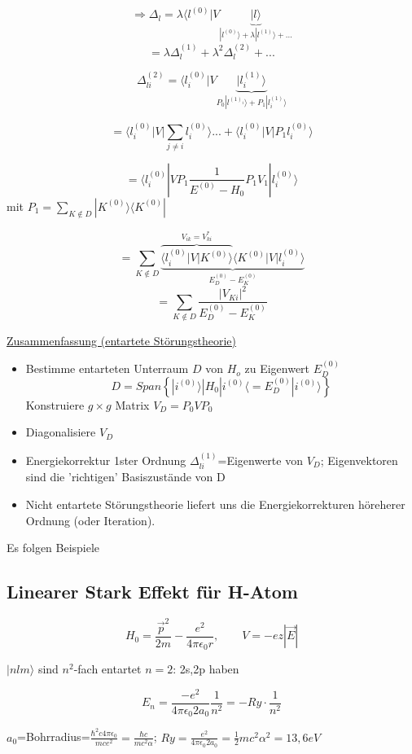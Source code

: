 \[ \Rightarrow \Delta_l = \lambda \langle l^{(0)}| V \underbrace{|l\rangle}_{|l^{(0)}\rangle+\lambda|l^{(1)}\rangle+...}\]
\[ =\lambda \Delta^{(1)}_l+\lambda^2\Delta^{(2)}_l+...\]


\[  \Delta^{(2)}_{li} = \langle l^{(0)}_i| V \underbrace{|l^{(1)}_i\rangle}_{P_0|l^{(1)_i}\rangle+P_1|l^{(1)}_i\rangle}\]

\[ = \langle l^{(0)}_i| V |\sum_{j\neq i}l^{(0)}_i\rangle ...+\langle l^{(0)}_i|  V |P_1 l^{(0)}_i\rangle\]

\[ = \langle l^{(0)}_i| V P_1 \frac{1}{E^{(0)}-H_0} P_1V_1|l^{(0)}_i\rangle\]
mit \(P_1 = \sum_{K\notin D}|K^{(0)}\rangle\langle K^{(0)}|\)

\[ =  \sum_{K\notin D}\underbrace{\overbrace{\langle l^{(0)}_i| V | K^{(0)}\rangle}^{V_{ik}=V^*_{ki}}\langle K^{(0)}| V | l^{(0)}_i\rangle}_{E^{(0)}_D-E^{(0)}_K}\]
\[ =  \sum_{K\notin D} \frac{|V_{Ki}|^2}{E^{(0)}_D-E^{(0)}_K}\]


\underline{Zusammenfassung (entartete Störungstheorie)}


\begin{itemize}
\item Bestimme entarteten Unterraum \(D\) von \(H_o\) zu Eigenwert \(E^{(0)}_D\)
\[ D = Span\left\{ |i^{(0)}\rangle | H_0|i^{(0)}\langle = E^{(0)}_D |i^{(0)}\rangle \right\}\]
Konstruiere \(g\times g\) Matrix \(V_D = P_0VP_0\)
\item Diagonalisiere \(V_D\)
\item Energiekorrektur 1ster Ordnung \(\Delta^{(1)}_{li}\)=Eigenwerte von \(V_D\); Eigenvektoren sind die 'richtigen' Basiszustände von D
\item Nicht entartete Störungstheorie liefert uns die Energiekorrekturen höreherer Ordnung (oder Iteration).
\end{itemize}

Es folgen Beispiele

\subsection{Linearer Stark Effekt für H-Atom}


\[ H_0 = \frac{\vec p^2}{2m}-\frac{e^2}{4\pi\epsilon_0 r}, \qquad V=-ez|\vec E|\]

\(|nlm\rangle\) sind \(n^2\)-fach entartet \(n=2\): 2s,2p haben

\[ E_n = \frac{-e^2}{4\pi\epsilon_0 2a_0}\frac{1}{n^2}=-Ry\cdot \frac{1}{n^2}\]

\(a_0\)=Bohrradius=\(\frac{\hbar^2 c4\pi\epsilon_0}{mce^2}= \frac{\hbar c}{mc^2\alpha}\); \(Ry = \frac{e^2}{4\pi\epsilon_0 2a_0}=\frac{1}{2}mc^2 \alpha^2 = 13,6 eV\)


